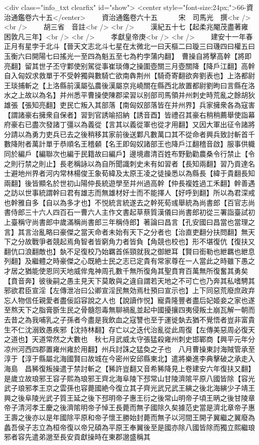 <div class="info_txt clearfix" id="show">
<center style="font-size:24px;">66-資治通鑑卷六十五</center>
  　　資治通鑑卷六十五　　　宋　司馬光　撰<br />
<br />
　　胡三省　音註<br />
<br />
　　漢紀五十七【起柔兆閹茂盡著雍困敦凡三年】<br />
<br />
　　孝獻皇帝庚<br />
<br />
　　建安十一年春正月有星孛于北斗【晉天文志北斗七星在太微北一曰天樞二曰璇三曰璣四曰權五曰玉衡六曰開陽七曰搖光一至四為魁五至七為杓孛蒲内翻】　曹操自將擊高幹【將即亮翻】留其世子丕守鄴使别駕從事崔琰傳之操圍壺關三月壺關降【降戶江翻】高幹自入匈奴求救單于不受幹獨與數騎亡欲南犇荆州【騎奇寄翻欲奔劉表也】上洛都尉王琰捕斬之【上洛縣前漢屬弘農後漢屬京兆嶢關在縣西北故置都尉劉昫曰言縣在洛水之上故以為名】并州悉平曹操使陳郡梁習以别部司馬領并州刺史時荒亂之餘胡狄雄張【張知亮翻】吏民亡叛入其部落【南匈奴部落皆在并州界】兵家擁衆各為寇害【謂諸豪右擁衆自保者】習到官誘喻招納【誘音酉】皆禮召其豪右稍稍薦舉使詣幕府豪右已盡次發諸丁彊以為義從【言其以義從軍也從才用翻】又因大軍出征令諸將分請以為勇力吏兵已去之後稍移其家前後送鄴凡數萬口其不從命者興兵致討斬首千數降附者萬計單于恭順名王稽顙【名王即匈奴諸部王也降戶江翻稽音啟】服事供軄同於編戶【編聯次也編于民籍故曰編戶】邊境肅清百姓布野勤勸農桑令行禁止【令之則行禁之則止】長老稱詠以為自所聞識刺史未有如習者【長知兩翻】習乃貢達名士避地州界者河内常林楊俊王象荀緯及太原王凌之徒操悉以為縣長【緯于貴翻長知兩翻】後皆顯名於世初山陽仲長統遊學至并州過高幹【仲長複姓過工禾翻】幹善遇之訪以世事統謂幹曰君有雄志而無雄材好士而不能擇人【好呼到翻】所以為君深戒也幹雅自多【自以為多才也】不悦統言統遂去之幹死荀彧舉統為尚書郎【百官志尚書侍郎三十六人四百石一曹六人主作文書起草蔡質漢儀曰尚書郎初從三署詣臺試初上臺稱守尚書郎中歲滿稱尚書郎三年稱侍郎】著論曰昌言【孔安國曰昌當也當理之言】其言治亂略曰豪傑之當天命者未始有天下之分者也【治直吏翻分扶問翻】無天下之分故戰爭者競起焉角智者皆窮角力者皆負【角競也校也】形不堪復伉【復扶又翻伉口浪翻敵也】埶不足復校乃始羈首係頸就我之御紲耳【賢曰銜勒也紲羈也紲息列翻】及繼體之時豪傑之心既絶士民之志已定貴有常家尊在一人當此之時雖下愚之才居之猶能使恩同天地威侔鬼神周孔數千無所復角其聖賁育百萬無所復奮其勇矣【賁音奔】彼後嗣之愚主見天下莫敢與之違自謂若天地之不可亡也乃奔其私嗜騁其邪欲君臣宣淫【左傳泄冶曰公卿宣淫民無効焉杜預曰宣示也】上下同惡荒廢庶政弃忘人物信任親愛者盡佞諂容說之人也【說讀作悦】寵貴隆豐者盡后妃姬妾之家也遂至熬天下之脂膏斵生民之骨髓怨毒無聊禍亂並起中國擾攘四夷侵叛土崩瓦解一朝而去昔之為我哺乳之子孫者今盡是我飲血之寇讐也至于運徙埶去猶不覺悟者豈非富貴生不仁沈溺致愚疾邪【沈持林翻】存亡以之迭代治亂從此周復【左傳美惡周必復天之道也】天道常然之大數也　秋七月武威太守張猛殺雍州刺史邯鄲商【興平元年分凉州河西四郡置雍州雍於用翻】州兵討誅之猛奐之子也　八月曹操東討海賊管承至淳于【淳于縣屬北海國賢曰故城在今密州安邱縣東北】遣將樂進李典擊破之承走入海島　昌豨復叛操遣于禁討斬之【豨許豈翻又音希豨降見上卷建安六年復扶又翻】是歲立故琅邪王容子熙為琅邪王齊北海阜陵下邳常山甘陵濟隂平原八國皆除【容光武子琅邪孝王京之雲孫也容薨國絶今復立其子齊光武兄武王縯之後北海縯少子靖王興之後阜陵光武子質王延之後下邳明帝子惠王衍之後常山明帝子頃王昞之後甘陵章帝子清河孝王慶之後濟隂明帝子悼王長薨而無子國除久矣據范史當是濟北章帝子惠王壽之後亦以是年國除平原和帝子懷王勝始封薨而無子以河間王開子翼繼之翼廢為蠡吾侯子志立為桓帝復以帝兄碩為平原王奉翼後至是國亦除八國皆除而獨立熙繼琅邪者容先遣弟邈至長安貢獻操時在東郡邈盛稱其